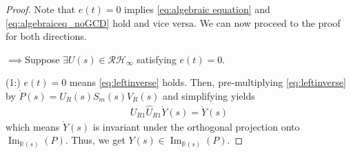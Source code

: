 \documentclass[10pt,a4paper]{amsart}
\theoremstyle{remark}
\DeclareMathOperator*{\im}{Im}
\begin{document}
\begin{proof}
Note that $e(t)=0$ implies \eqref{eq:algebraic equation} and \eqref{eq:algebraiceq_noGCD} hold and vice versa. We can now proceed to the proof for both directions.

$\implies$Suppose $\exists U(s) \in \mathcal{R}\mathcal{H}_\infty$ satisfying $e(t)=0$.

(1:) $e(t)=0$ means \eqref{eq:leftinverse} holds. Then, pre-multiplying \eqref{eq:leftinverse} by $ \grave{P}(s) = U_R(s)S_m(s)V_R(s)$ and simplifying yields
\begin{align} \label{eq:Y invaiance}
    U_{R1}\hat{U}_{R1}\grave{Y}(s)=\grave{Y}(s)
\end{align}
which means $\grave{Y}(s)$ is invariant under the orthogonal projection onto $\im_{\mathbb{R}(s)}(P)$. Thus, we get $Y(s) \in \im_{\mathbb{R}(s)}(P)$.


\end{proof}
\end{document}
